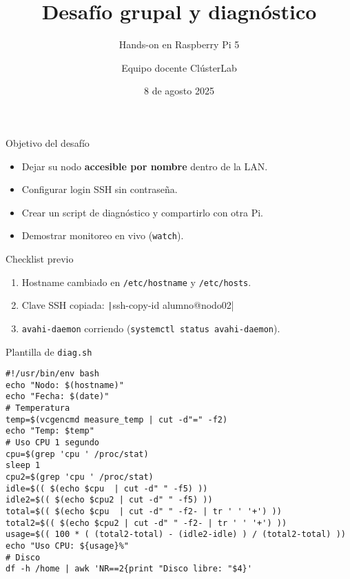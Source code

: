 \documentclass[aspectratio=169, professionalfonts]{beamer}
\title[ClústerLab • Día 3]{Desafío grupal y diagnóstico}
\subtitle{Hands-on en Raspberry Pi 5}
\author{Equipo docente ClústerLab}
\date{8 de agosto 2025}
\begin{document}
\begin{frame}[plain]
  \titlepage
\end{frame}

\begin{frame}{Objetivo del desafío}
\begin{itemize}
  \item Dejar su nodo \textbf{accesible por nombre} dentro de la LAN.  
  \item Configurar login SSH sin contraseña.  
  \item Crear un script de diagnóstico y compartirlo con otra Pi.  
  \item Demostrar monitoreo en vivo (\texttt{watch}).  
\end{itemize}
\end{frame}

\begin{frame}{Checklist previo}
\begin{enumerate}
  \item Hostname cambiado en \texttt{/etc/hostname} y \texttt{/etc/hosts}.  
  \item Clave SSH copiada: \texttt|ssh-copy-id alumno@nodo02|  
  \item \texttt{avahi-daemon} corriendo (\texttt{systemctl status avahi-daemon}).  
\end{enumerate}
\end{frame}

\begin{frame}[fragile]{Plantilla de \texttt{diag.sh}}
\begin{verbatim}
#!/usr/bin/env bash
echo "Nodo: $(hostname)"
echo "Fecha: $(date)"
# Temperatura
temp=$(vcgencmd measure_temp | cut -d"=" -f2)
echo "Temp: $temp"
# Uso CPU 1 segundo
cpu=$(grep 'cpu ' /proc/stat)
sleep 1
cpu2=$(grep 'cpu ' /proc/stat)
idle=$(( $(echo $cpu  | cut -d" " -f5) ))
idle2=$(( $(echo $cpu2 | cut -d" " -f5) ))
total=$(( $(echo $cpu  | cut -d" " -f2- | tr ' ' '+') ))
total2=$(( $(echo $cpu2 | cut -d" " -f2- | tr ' ' '+') ))
usage=$(( 100 * ( (total2-total) - (idle2-idle) ) / (total2-total) ))
echo "Uso CPU: ${usage}%"
# Disco
df -h /home | awk 'NR==2{print "Disco libre: "$4}'
\end{verbatim}
\end{frame}
\end{document}
